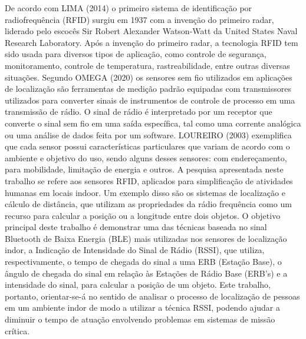 \documentclass[
	article,			%
	12pt,				%
	oneside,			%
	a4paper,			%
	english,			%
	brazil,				%
	sumario=tradicional
	]{abntex2}
\begin{document}
De acordo com LIMA (2014) o primeiro sistema de identificação por radiofrequência (RFID) surgiu em 1937 com a invenção do primeiro radar, liderado pelo escocês Sir Robert Alexander Watson-Watt da United States Naval Research Laboratory.
Após a invenção do primeiro radar, a tecnologia RFID tem sido usada para diversos tipos de aplicação, como controle de segurança, monitoramento, controle de temperatura, rastreabilidade, entre outras diversas situações.
Segundo OMEGA (2020) os sensores sem fio utilizados em aplicações de localização são ferramentas de medição padrão equipadas com transmissores utilizados para converter sinais de instrumentos de controle de processo em uma transmissão de rádio. O sinal de rádio é interpretado por um receptor que converte o sinal sem fio em uma saída específica, tal como uma corrente analógica ou uma análise de dados feita por um software.  
LOUREIRO (2003) exemplifica que cada sensor possui características particulares que variam de acordo com o ambiente e objetivo do uso, sendo alguns desses sensores: com endereçamento, para mobilidade, limitação de energia e outros.
A pesquisa apresentada neste trabalho se refere aos sensores RFID, aplicados para simplificação de atividades humanas em locais indoor. Um exemplo disso são os sistemas de localização e cálculo de distância, que utilizam as propriedades da rádio frequência como um recurso para calcular a posição ou a longitude entre dois objetos.
O objetivo principal deste trabalho é demonstrar uma das técnicas baseada no sinal Bluetooth de Baixa Energia (BLE) mais utilizadas nos sensores de localização indor, a Indicação de Intensidade do Sinal de Rádio (RSSI), que utiliza, respectivamente, o tempo de chegada do sinal a uma ERB (Estação Base), o ângulo de chegada do sinal em relação às Estações de Rádio Base (ERB’s) e a intensidade do sinal, para calcular a posição de um objeto.  
Este trabalho, portanto, orientar-se-á no sentido de analisar o processo de localização de pessoas em um ambiente indor de modo a utilizar a técnica RSSI, podendo ajudar a diminuir o tempo de atuação envolvendo problemas em sistemas de missão crítica.
\end{document}
